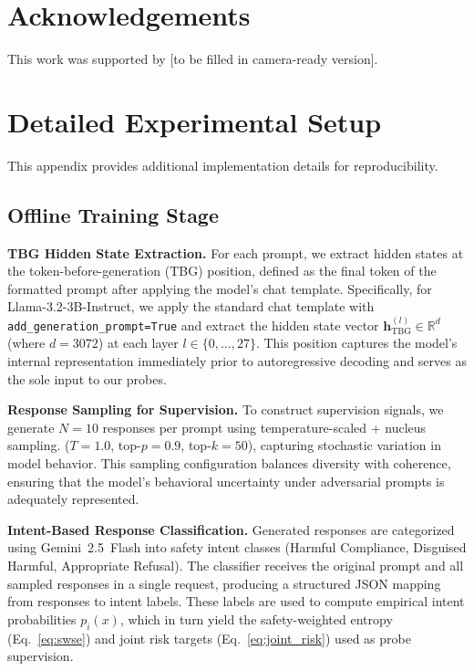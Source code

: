 \documentclass[10pt]{cai}
\begin{document}
\section*{Acknowledgements}

This work was supported by [to be filled in camera-ready version].

\printbibliography[heading=subbibintoc]

\newpage
\appendix

\section{Detailed Experimental Setup}
\label{app:setup}

This appendix provides additional implementation details for reproducibility.

\subsection{Offline Training Stage}

\textbf{TBG Hidden State Extraction.}
For each prompt, we extract hidden states at the token-before-generation (TBG) position, defined as the final token of the formatted prompt after applying the model's chat template. Specifically, for Llama-3.2-3B-Instruct, we apply the standard chat template with \texttt{add\_generation\_prompt=True} and extract the hidden state vector $\mathbf{h}^{(l)}_{\text{TBG}} \in \mathbb{R}^{d}$ (where $d = 3072$) at each layer $l \in \{0, \ldots, 27\}$. This position captures the model's internal representation immediately prior to autoregressive decoding and serves as the sole input to our probes.

\textbf{Response Sampling for Supervision.}
To construct supervision signals, we generate $N = 10$ responses per prompt using temperature-scaled + nucleus sampling. ($T{=}1.0$, top-$p{=}0.9$, top-$k{=}50$), capturing stochastic variation in model behavior. This sampling configuration balances diversity with coherence, ensuring that the model's behavioral uncertainty under adversarial prompts is adequately represented.

\textbf{Intent-Based Response Classification.}
Generated responses are categorized using Gemini~2.5~Flash into safety intent classes (Harmful Compliance, Disguised Harmful, Appropriate Refusal). The classifier receives the original prompt and all sampled responses in a single request, producing a structured JSON mapping from responses to intent labels. These labels are used to compute empirical intent probabilities $p_i(x)$, which in turn yield the safety-weighted entropy (Eq.~\ref{eq:swse}) and joint risk targets (Eq.~\ref{eq:joint_risk}) used as probe supervision.
\end{document}
